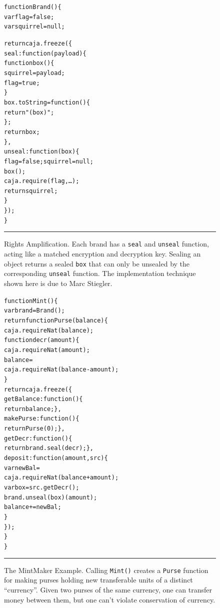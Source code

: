 \documentclass[letterpaper,twocolumn,10pt]{article}
\newcommand{\code}[1]{{\tt {#1}}}              %
\begin{document}
\begin{figure}[t!]
\begin{alltt}
function Brand() \{
  var flag = false;
  var squirrel = null;

  return caja.freeze(\{
    seal: function(payload) \{
      function box() \{
        squirrel = payload;
        flag = true;
      \}
      box.toString = function() \{
        return "(box)";
      \};
      return box;
    \},
    unseal: function(box) \{
      flag = false; squirrel = null;
      box();
      caja.require(flag,\ldots);
      return squirrel;
    \}
  \});
\}
\end{alltt}

\caption[Rights Amplification]{Rights Amplification. Each brand has a 
\code{seal} and \code{unseal} function, acting like a matched encryption and 
decryption key. Sealing an object returns a sealed \code{box} that can only 
be unsealed by the corresponding \code{unseal} function. The implementation 
technique shown here is due to Marc Stiegler.
\\ } \hrule
\label{fig:rights-amp}
\end{figure}

\begin{figure}[t!]
\begin{alltt}
function Mint() \{
  var brand = Brand();
  return function Purse(balance) \{
    caja.requireNat(balance);
    function decr(amount) \{
      caja.requireNat(amount);
      balance = 
        caja.requireNat(balance - amount);
    \}
    return caja.freeze(\{
      getBalance: function() \{
        return balance; \},
      makePurse:  function() \{
        return Purse(0); \},
      getDecr:    function() \{
        return brand.seal(decr); \},
      deposit: function(amount,src) \{
        var newBal = 
          caja.requireNat(balance+amount);
        var box = src.getDecr();
        brand.unseal(box)(amount);
        balance += newBal;
      \}
    \});
  \}
\}
\end{alltt}

\caption[The MintMaker Example]{The MintMaker Example. Calling \code{Mint()} 
creates a \code{Purse} function for making purses holding new transferable 
units of a distinct ``currency''. Given two purses of the same currency, one 
can transfer money between them, but one can't violate conservation of 
currency. \\ } \hrule
\label{fig:mintmaker}
\end{figure}
\end{document}

